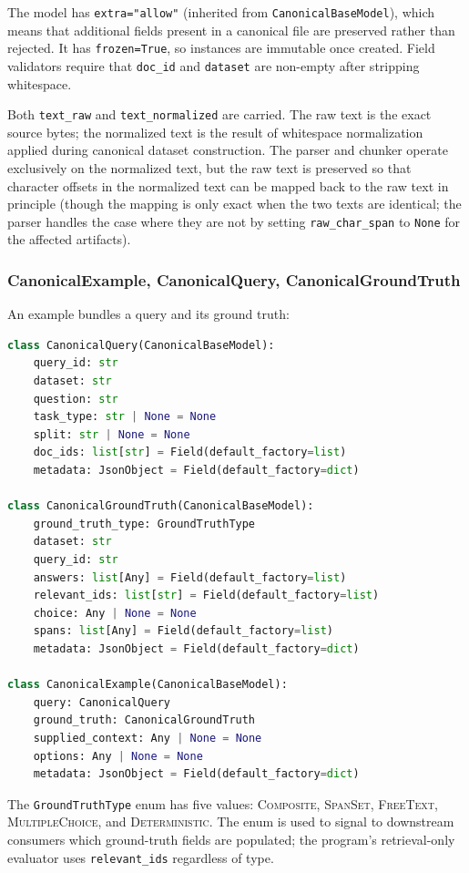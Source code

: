 \documentclass[11pt,a4paper]{article}
\begin{document}
The model has \texttt{extra="allow"} (inherited from
\texttt{CanonicalBaseModel}), which means that additional fields
present in a canonical file are preserved rather than rejected. It
has \texttt{frozen=True}, so instances are immutable once created.
Field validators require that \texttt{doc_id} and \texttt{dataset}
are non-empty after stripping whitespace.

Both \texttt{text\_raw} and \texttt{text\_normalized} are carried.
The raw text is the exact source bytes; the normalized text is the
result of whitespace normalization applied during canonical dataset
construction. The parser and chunker operate exclusively on the
normalized text, but the raw text is preserved so that character
offsets in the normalized text can be mapped back to the raw text
in principle (though the mapping is only exact when the two texts
are identical; the parser handles the case where they are not by
setting \texttt{raw\_char\_span} to \texttt{None} for the affected
artifacts).

\subsubsection{CanonicalExample, CanonicalQuery, CanonicalGroundTruth}
An example bundles a query and its ground truth:
\begin{lstlisting}[language=python]
class CanonicalQuery(CanonicalBaseModel):
    query_id: str
    dataset: str
    question: str
    task_type: str | None = None
    split: str | None = None
    doc_ids: list[str] = Field(default_factory=list)
    metadata: JsonObject = Field(default_factory=dict)

class CanonicalGroundTruth(CanonicalBaseModel):
    ground_truth_type: GroundTruthType
    dataset: str
    query_id: str
    answers: list[Any] = Field(default_factory=list)
    relevant_ids: list[str] = Field(default_factory=list)
    choice: Any | None = None
    spans: list[Any] = Field(default_factory=list)
    metadata: JsonObject = Field(default_factory=dict)

class CanonicalExample(CanonicalBaseModel):
    query: CanonicalQuery
    ground_truth: CanonicalGroundTruth
    supplied_context: Any | None = None
    options: Any | None = None
    metadata: JsonObject = Field(default_factory=dict)
\end{lstlisting}

The \texttt{GroundTruthType} enum has five values:
\textsc{Composite}, \textsc{SpanSet}, \textsc{FreeText},
\textsc{MultipleChoice}, and \textsc{Deterministic}. The enum is used
to signal to downstream consumers which ground-truth fields are
populated; the program's retrieval-only evaluator uses
\texttt{relevant\_ids} regardless of type.
\end{document}
